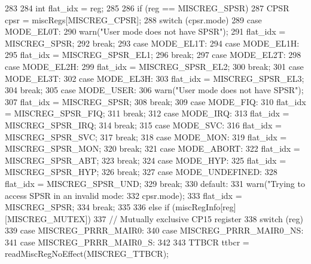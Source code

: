 \begin{DoxyCode}
283         {
284             int flat_idx = reg;
285 
286             if (reg == MISCREG_SPSR) {
287                 CPSR cpsr = miscRegs[MISCREG_CPSR];
288                 switch (cpsr.mode) {
289                   case MODE_EL0T:
290                     warn("User mode does not have SPSR\n");
291                     flat_idx = MISCREG_SPSR;
292                     break;
293                   case MODE_EL1T:
294                   case MODE_EL1H:
295                     flat_idx = MISCREG_SPSR_EL1;
296                     break;
297                   case MODE_EL2T:
298                   case MODE_EL2H:
299                     flat_idx = MISCREG_SPSR_EL2;
300                     break;
301                   case MODE_EL3T:
302                   case MODE_EL3H:
303                     flat_idx = MISCREG_SPSR_EL3;
304                     break;
305                   case MODE_USER:
306                     warn("User mode does not have SPSR\n");
307                     flat_idx = MISCREG_SPSR;
308                     break;
309                   case MODE_FIQ:
310                     flat_idx = MISCREG_SPSR_FIQ;
311                     break;
312                   case MODE_IRQ:
313                     flat_idx = MISCREG_SPSR_IRQ;
314                     break;
315                   case MODE_SVC:
316                     flat_idx = MISCREG_SPSR_SVC;
317                     break;
318                   case MODE_MON:
319                     flat_idx = MISCREG_SPSR_MON;
320                     break;
321                   case MODE_ABORT:
322                     flat_idx = MISCREG_SPSR_ABT;
323                     break;
324                   case MODE_HYP:
325                     flat_idx = MISCREG_SPSR_HYP;
326                     break;
327                   case MODE_UNDEFINED:
328                     flat_idx = MISCREG_SPSR_UND;
329                     break;
330                   default:
331                     warn("Trying to access SPSR in an invalid mode: %
332                          cpsr.mode);
333                     flat_idx = MISCREG_SPSR;
334                     break;
335                 }
336             } else if (miscRegInfo[reg][MISCREG_MUTEX]) {
337                 // Mutually exclusive CP15 register
338                 switch (reg) {
339                   case MISCREG_PRRR_MAIR0:
340                   case MISCREG_PRRR_MAIR0_NS:
341                   case MISCREG_PRRR_MAIR0_S:
342                     {
343                         TTBCR ttbcr = readMiscRegNoEffect(MISCREG_TTBCR);
}}}}
\end{DoxyCode}
